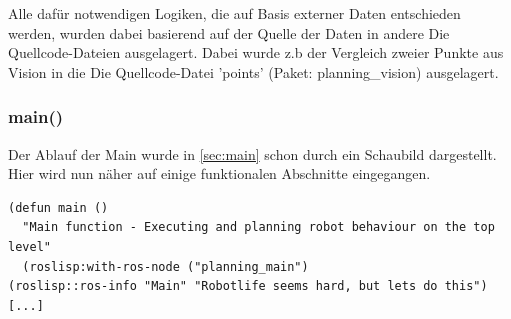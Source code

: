 \documentclass{suturo}
\begin{document}
\begin{figure}[!htb]
\end{figure}


Alle dafür notwendigen Logiken, die auf Basis externer Daten entschieden werden, wurden dabei basierend auf der Quelle der Daten in andere Die Quellcode-Dateien ausgelagert. Dabei wurde z.b der Vergleich zweier Punkte aus Vision in die Die Quellcode-Datei 'points' (Paket: planning\_vision) ausgelagert.


\subsubsection{main()}

Der Ablauf der Main wurde in \ref{sec:main} schon durch ein Schaubild dargestellt. Hier wird nun näher auf einige funktionalen Abschnitte eingegangen.



\noindent
\begin{minipage}{\linewidth}
\begin{lstlisting}
(defun main ()
  "Main function - Executing and planning robot behaviour on the top level"
  (roslisp:with-ros-node ("planning_main")
(roslisp::ros-info "Main" "Robotlife seems hard, but lets do this")
[...]
\end{lstlisting}
\end{minipage}
\end{document}
